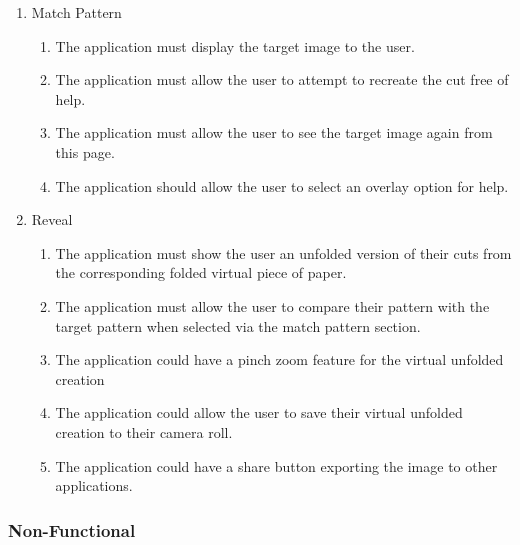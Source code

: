 \documentclass[11pt]{article}
\begin{document}
\begin{enumerate}
      \item Match Pattern
        \begin{enumerate}[label*=\arabic*.]
        \item The application must display the target image to the user.
        \item The application must allow the user to attempt to recreate the cut free of help. 
        \item The application must allow the user to see the target image again from this page. 
        \item The application should allow the user to select an overlay option for help.
      \end{enumerate}

       \item Reveal
          \begin{enumerate}[label*=\arabic*.]
            \item The application must show the user an unfolded version of their cuts from the corresponding folded virtual piece of paper. 
            \item The application must allow the user to compare their pattern with the target pattern when selected via the match pattern section.
            \item The application could have a pinch zoom feature for the virtual unfolded creation 
            \item The application could allow the user to save their virtual unfolded creation to their camera roll.
            \item The application could have a share button exporting the image to other applications. 
          \end{enumerate}
        \end{enumerate}

    
   \subsubsection{ Non-Functional}
    
\end{document}
